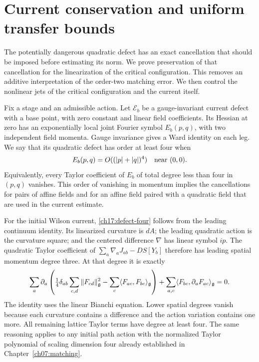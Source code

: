 \section{Current conservation and uniform transfer bounds}
\label{ch17:quadratic-current}

The potentially dangerous quadratic defect has an exact cancellation
that should be imposed before estimating its norm. We prove preservation
of that cancellation for the linearization of the critical configuration. This removes
an additive interpretation of the order-two matching error. We then control the nonlinear
jets of the critical configuration and the current itself.

Fix a stage and an admissible action. Let $\mathcal E_b$ be a
gauge-invariant current defect with a base point, with zero constant and linear
field coefficients. Its Hessian at zero has an exponentially local
joint Fourier symbol $E_b(p,q)$, with two independent field momenta.
Gauge invariance gives a Ward identity on each leg. We say that its
quadratic defect has order at least four when
\begin{equation}
                    E_b(p,q)=O((|p|+|q|)^4)
                              \quad\hbox{near }(0,0).
 \label{ch17:defect-four}
\end{equation}
Equivalently, every Taylor coefficient of $E_b$ of total degree less
than four in $(p,q)$ vanishes. This order of vanishing in momentum
implies the cancellations for pairs of affine fields and for an affine
field paired with a quadratic field that are used in the current estimate.

For the initial Wilson current, \eqref{ch17:defect-four} follows from
the leading continuum identity. Its linearized curvature is $dA$;
the leading quadratic action is the curvature square; and the centered
difference $\nabla$ has linear symbol $ip$. The quadratic Taylor
coefficient of
$\sum_a\nabla_aJ_{ab}-DS[Y_b]$ therefore has leading spatial
momentum degree three. At that degree it is exactly
\[
 \sum_a\partial_a\left(\tfrac14\delta_{ab}\sum_{c,d}\|F_{cd}\|_{\mathfrak g}^2
                         -\sum_c \langle F_{ac},F_{bc}\rangle_{\mathfrak g}\right)
       +\sum_{a,c} \langle F_{bc},\partial_aF_{ac}\rangle_{\mathfrak g}=0.
\]
The identity uses the linear Bianchi equation. Lower spatial degrees vanish because each curvature
contains a difference and the action variation contains one more.
All remaining lattice Taylor terms have degree at least four.
The same reasoning applies to any initial path action with the
normalized Taylor polynomial of scaling dimension four already established in
Chapter~\ref{ch07:matching}.

